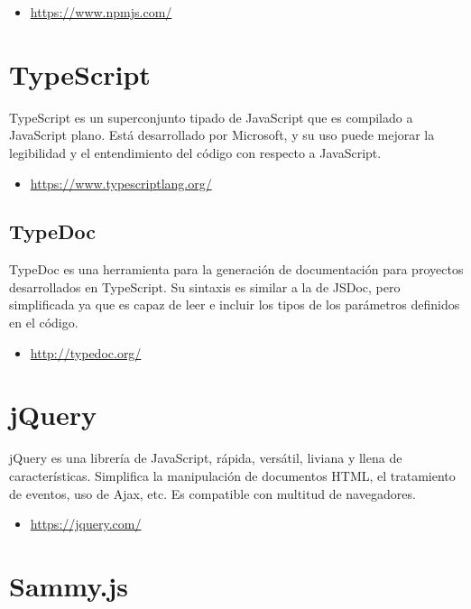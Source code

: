 \begin{itemize}
	\item \url{https://www.npmjs.com/}
\end{itemize}

\section{TypeScript}

TypeScript es un superconjunto tipado de JavaScript que es compilado a JavaScript plano. Está desarrollado por Microsoft, y su uso puede mejorar la legibilidad y el entendimiento del código con respecto a JavaScript.

\begin{itemize}
	\item \url{https://www.typescriptlang.org/}
\end{itemize}

\subsection{TypeDoc}

TypeDoc es una herramienta para la generación de documentación para proyectos desarrollados en TypeScript. Su sintaxis es similar a la de JSDoc, pero simplificada ya que es capaz de leer e incluir los tipos de los parámetros definidos en el código.

\begin{itemize}
	\item \url{http://typedoc.org/}
\end{itemize}

\section{jQuery}

jQuery es una librería de JavaScript, rápida, versátil, liviana y llena de características. Simplifica la manipulación de documentos HTML, el tratamiento de eventos, uso de Ajax, etc. Es compatible con multitud de navegadores.

\begin{itemize}
	\item \url{https://jquery.com/}
\end{itemize}

\section{Sammy.js}

